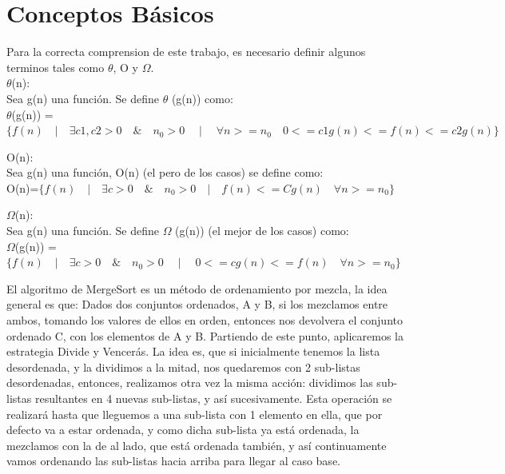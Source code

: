 \documentclass[spanish]{article}
\begin{document}
\newpage
	\section{Conceptos B\'asicos}
	Para la correcta comprension de este trabajo, es necesario definir algunos terminos tales como $\theta$, O y $\Omega$.\\
	 $\theta$(n):\\
		Sea g(n) una función. Se define  $\theta$ (g(n)) como:\\
		
		 	$\theta$(g(n)) = $\{ f(n) \quad | \quad \exists c1,c2>0 \quad \& \quad n_{0}>0 \quad \mid \quad \forall n>=n_{0} \quad 0<= c1g(n) <= f(n) <= c2g(n) \}$
	\bigskip		 	
		 	
	O(n):\\
		Sea  g(n)  una función, O(n) (el pero de los casos) se define como:\\
		
			\hspace{1cm}O(n)=$\{f(n) \quad | \quad \exists c >0 \quad \& \quad n_{0}>0 \quad | \quad f(n) <= Cg(n) \quad \forall  n>= n_{0} \}$
	\bigskip
	
	$\Omega$(n):\\
	Sea  g(n)  una función. Se define $\Omega$ (g(n)) (el mejor de los casos) como:\\

		\hspace{1cm}$\Omega$(g(n)) =$\{f(n) \quad | \quad \exists c >0 \quad \& \quad n_{0}>0 \quad \mid \quad  0<= cg(n)<= f(n) \quad \forall n>= n_{0} \}$
	\bigskip

	El algoritmo de MergeSort es un método de ordenamiento por mezcla, la idea general es que: Dados dos conjuntos ordenados, A y B, si los mezclamos entre ambos, tomando los valores de ellos en orden, entonces nos devolvera el conjunto ordenado C, con los elementos de A y B.
	\bigskip
	Partiendo de este punto, aplicaremos la estrategia Divide y Vencerás. La idea es, que si inicialmente tenemos la lista desordenada, y la dividimos a la mitad, nos quedaremos con 2 sub-listas desordenadas, entonces, realizamos otra vez la misma acción: dividimos las sub-listas resultantes en 4 nuevas sub-listas, y así sucesivamente.
	\bigskip
	Esta operación se realizará hasta que lleguemos a una sub-lista con 1  elemento en ella, que por defecto va a estar ordenada, y como dicha sub-lista ya está ordenada, la mezclamos con la de al lado, que está ordenada también, y así continuamente vamos ordenando las sub-listas hacia arriba para llegar al caso base.
\end{document}
